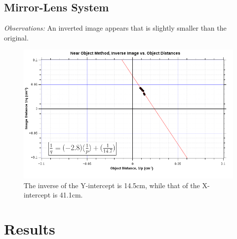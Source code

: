 \documentclass[twocolumn,english]{IEEEtran}
\theoremstyle{plain}
\theoremstyle{plain}
\begin{document}
\subsection{Mirror-Lens System}
\textit{Observations:} An inverted image appears that is slightly smaller than the original.

\onecolumn

\begin{figure}[h!]
	\begin{centering}
	\begin{center}
	\includegraphics[width=\linewidth]{./Graph1.png}
	\caption{The inverse of the Y-intercept is 14.5cm, while that of the X-intercept is 41.1cm.}
	\label{fig:1q1p}
	\end{center}
	\par\end{centering}
\end{figure}

\twocolumn
\section{Results}
\end{document}
